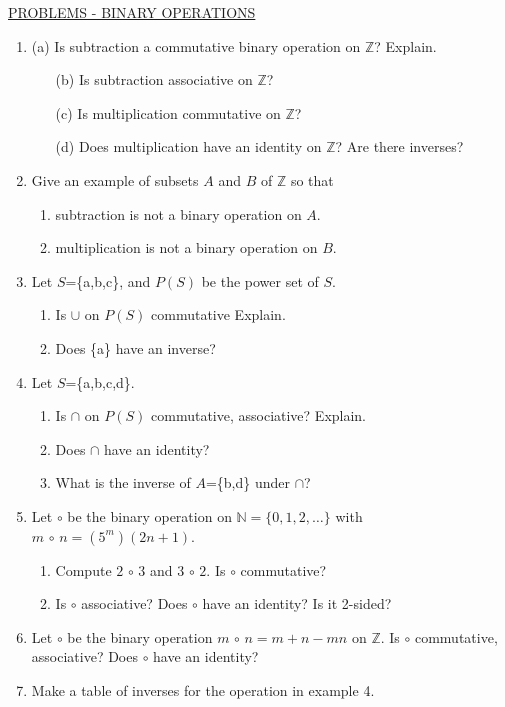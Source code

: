 \documentclass[12pt]{book}
\theoremstyle{definition}
\def\Z{\mathbb{Z}}
\begin{document}
\underline{PROBLEMS - BINARY OPERATIONS}
\begin{enumerate}
\item \hspace{.2cm}(a) Is subtraction a commutative binary operation on $\Z$?  Explain.
\begin{enumerate}
\item[(b)] Is subtraction associative on $\Z$?
\item[(c)] Is multiplication commutative on $\Z$?
\item[(d)]  Does multiplication have an identity on $\Z$?  Are there inverses?
\end{enumerate}
\item Give an example of subsets $A$ and $B$ of $\Z$ so that
\begin{enumerate}
\item subtraction is not a binary operation on $A$.
\item multiplication is not a binary operation on $B$.
\end{enumerate}
\item Let $S$=\{a,b,c\}, and $P(S)$ be the power set of $S$.
\begin{enumerate}
\item Is $\cup$ on $P(S)$ commutative  Explain.
\item Does \{a\} have an inverse?
\end{enumerate}
\item Let $S$=\{a,b,c,d\}.
\begin{enumerate}
\item Is $\cap$ on $P(S)$ commutative, associative?  Explain.
\item Does $\cap$ have an identity?
\item What is the inverse of $A$=\{b,d\} under $\cap$?
\end{enumerate}
\item Let $\circ$ be the binary operation on $\mathbb{N}=\{0,1,2,\dots\}$ with $m\,\circ\,n = (5^m)(2n+1)$.
\begin{enumerate}
\item Compute $2\,\circ\, 3$ and $ 3\,\circ\,2$.  Is $\circ$ commutative?
\item Is $\circ$ associative?  Does $\circ$ have an identity? Is it 2-sided?
\end{enumerate}
\item Let $\circ$ be the binary operation $m\,\circ\,n=m+n-mn$ on $\Z$.  Is $\circ$ commutative, associative?  Does $\circ$ have an identity?
\item Make a table of inverses for the operation in example 4.

\end{enumerate}
\end{document}

